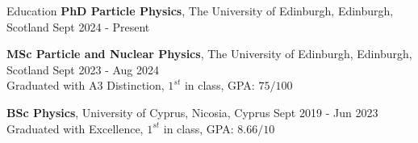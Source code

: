 \documentclass{resume} %
\begin{document}
        \vspace{-1em}
        \begin{rSection}{Education}
                {\bf PhD Particle Physics}, The University of Edinburgh, Edinburgh, Scotland \hfill {Sept 2024 - Present}\\

                \vspace{-1.3em}

                {\bf MSc Particle and Nuclear Physics}, The University of Edinburgh, Edinburgh, Scotland \hfill {Sept 2023 - Aug 2024}\\
                Graduated with A3 Distinction, $1^{st}$ in class, GPA: $75/100$
                
                \vspace{-0.3em}

                {\bf BSc Physics}, University of Cyprus, Nicosia, Cyprus \hfill {Sept 2019 - Jun 2023}\\
                Graduated with Excellence, $1^{st}$ in class, GPA: $8.66/10$
                
        \end{rSection}

        \vspace{-0.5em}
\end{document}
